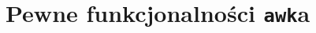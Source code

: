 \documentclass[10pt,t]{beamer}
\begin{document}














\section{Pewne funkcjonalności \texttt{awk}a}





\end{document}
